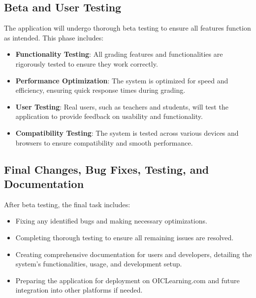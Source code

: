 \documentclass[ms,twoside,print]{nuthesis}
\begin{document}
\subsection{Beta and User Testing}
The application will undergo thorough beta testing to ensure all features function as intended. This phase includes:
\begin{itemize}
    \item \textbf{Functionality Testing}: All grading features and functionalities are rigorously tested to ensure they work correctly.
    \item \textbf{Performance Optimization}: The system is optimized for speed and efficiency, ensuring quick response times during grading.
    \item \textbf{User Testing}: Real users, such as teachers and students, will test the application to provide feedback on usability and functionality.
    \item \textbf{Compatibility Testing}: The system is tested across various devices and browsers to ensure compatibility and smooth performance.
\end{itemize}

\subsection{Final Changes, Bug Fixes, Testing, and Documentation}
After beta testing, the final task includes:
\begin{itemize}
    \item Fixing any identified bugs and making necessary optimizations.
    \item Completing thorough testing to ensure all remaining issues are resolved.
    \item Creating comprehensive documentation for users and developers, detailing the system's functionalities, usage, and development setup.
    \item Preparing the application for deployment on OICLearning.com and future integration into other platforms if needed.
\end{itemize}
\end{document}
